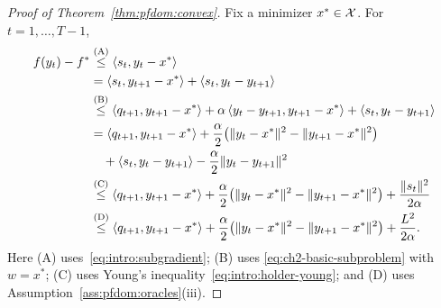 \begin{proof}[Proof of Theorem~\ref{thm:pfdom:convex}]
Fix a minimizer $x^*\in\mathcal{X}$. For $t=1,\ldots,T-1$,
\begin{equation}\label{eq:pfdom:subgradient-young}
\begin{aligned}
 f(y_t)-f^*
 &\overset{\mathrm{(A)}}{\le}\left\langle s_t,y_t-x^* \right\rangle\\
 &=\left\langle s_t,y_{t+1}-x^* \right\rangle+\left\langle s_t,y_t-y_{t+1} \right\rangle\\
 &\overset{\mathrm{(B)}}{\le}\left\langle q_{t+1},y_{t+1}-x^* \right\rangle
   +\alpha\left\langle y_t-y_{t+1},y_{t+1}-x^* \right\rangle
   +\left\langle s_t,y_t-y_{t+1} \right\rangle\\
 &=\left\langle q_{t+1},y_{t+1}-x^* \right\rangle
   +\frac\alpha2\bigl(\|y_t-x^*\|^2-\|y_{t+1}-x^*\|^2\bigr)\\
 &\quad+\left\langle s_t,y_t-y_{t+1} \right\rangle
   -\frac\alpha2\|y_t-y_{t+1}\|^2\\
 &\overset{\mathrm{(C)}}{\le}\left\langle q_{t+1},y_{t+1}-x^* \right\rangle
   +\frac\alpha2\bigl(\|y_t-x^*\|^2-\|y_{t+1}-x^*\|^2\bigr)
   +\frac{\|s_t\|^2}{2\alpha}\\
 &\overset{\mathrm{(D)}}{\le}\left\langle q_{t+1},y_{t+1}-x^* \right\rangle
   +\frac\alpha2\bigl(\|y_t-x^*\|^2-\|y_{t+1}-x^*\|^2\bigr)
   +\frac{L^2}{2\alpha}.
\end{aligned}
\end{equation}
Here (A) uses~\eqref{eq:intro:subgradient}; (B) uses
\eqref{eq:ch2-basic-subproblem} with $w=x^*$; (C) uses
Young's inequality~\eqref{eq:intro:holder-young}; and (D) uses
Assumption~\ref{ass:pfdom:oracles}(iii).


\end{proof}
